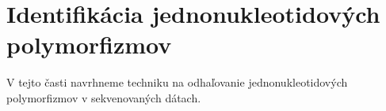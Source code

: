 \chapter{Identifikácia jednonukleotidových polymorfizmov}

\label{kap:identifikacia_SNP} %

V tejto časti navrhneme techniku na odhaľovanie jednonukleotidových
polymorfizmov v sekvenovaných dátach.
